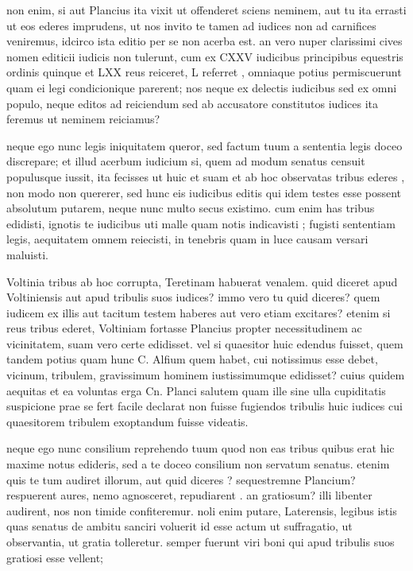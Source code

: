  non enim, si aut Plancius ita vixit ut offenderet sciens neminem, aut tu ita errasti ut eos ederes imprudens, ut nos invito te tamen ad iudices non ad carnifices veniremus, idcirco ista editio per se non acerba est. an vero nuper clarissimi cives nomen editicii iudicis non tulerunt, cum ex CXXV iudicibus principibus equestris ordinis quinque et LXX reus reiceret, L referret , omniaque potius permiscuerunt quam ei legi condicionique parerent; nos neque ex delectis iudicibus sed ex omni populo, neque editos ad reiciendum sed ab accusatore constitutos iudices ita feremus ut neminem reiciamus?

 neque ego nunc legis iniquitatem queror, sed factum tuum a sententia legis doceo discrepare; et illud acerbum iudicium si, quem ad modum senatus censuit populusque iussit, ita fecisses ut huic et suam et ab hoc observatas tribus ederes , non modo non quererer, sed hunc eis iudicibus editis qui idem testes esse possent absolutum putarem, neque nunc multo secus existimo. cum enim has tribus edidisti, ignotis te iudicibus uti malle quam notis indicavisti ; fugisti sententiam legis, aequitatem omnem reiecisti, in tenebris quam in luce causam versari maluisti.

 Voltinia tribus ab hoc corrupta, Teretinam habuerat venalem. quid diceret apud Voltiniensis aut apud tribulis suos iudices? immo vero tu quid diceres? quem iudicem ex illis aut tacitum testem haberes aut vero etiam excitares? etenim si reus tribus ederet, Voltiniam fortasse Plancius propter necessitudinem ac vicinitatem, suam vero certe edidisset. vel si quaesitor huic edendus fuisset, quem tandem potius quam hunc C. Alfium quem habet, cui notissimus esse debet, vicinum, tribulem, gravissimum hominem iustissimumque edidisset? cuius quidem aequitas et ea voluntas erga Cn. Planci salutem quam ille sine ulla cupiditatis suspicione prae se fert facile declarat non fuisse fugiendos tribulis huic iudices cui quaesitorem tribulem exoptandum fuisse videatis.

 neque ego nunc consilium reprehendo tuum quod non eas tribus quibus erat hic maxime notus edideris, sed a te doceo consilium non servatum senatus. etenim quis te tum audiret illorum, aut quid diceres ? sequestremne Plancium? respuerent aures, nemo agnosceret, repudiarent . an gratiosum? illi libenter audirent, nos non timide confiteremur. noli enim putare, Laterensis, legibus istis quas senatus de ambitu sanciri voluerit id esse actum ut suffragatio, ut observantia, ut gratia tolleretur. semper fuerunt viri boni qui apud tribulis suos gratiosi esse vellent;


